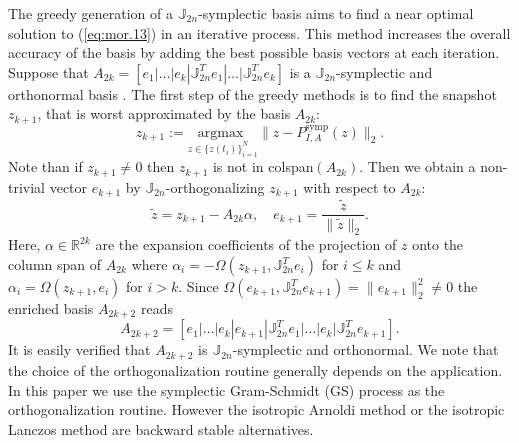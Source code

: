 The greedy generation of a $\mathbb J_{2n}$-symplectic basis aims to find a near optimal solution to (\ref{eq:mor.13}) in an iterative process. This method increases the overall accuracy of the basis by adding the best possible basis vectors at each iteration. Suppose that $A_{2k} = [e_1|\dots|e_k|\mathbb J_{2n}^T e_1|\dots|\mathbb J_{2n}^T e_k]$ is a $\mathbb J_{2n}$-symplectic and orthonormal basis \cite{doi:10.1137/17M1111991}. The first step of the greedy methods is to find the snapshot $z_{k+1}$, that is worst approximated by the basis $A_{2k}$:
\begin{equation} \label{eq:mor.14}
	z_{k+1} := \underset{z \in \{ z(t_i) \}_{i=1}^N}{\text{argmax } }\| z - P^\text{symp}_{I,A}(z) \|_2. 
\end{equation}
Note than if $z_{k+1}\neq 0$ then $z_{k+1}$ is not in colspan$(A_{2k})$. Then we obtain a non-trivial vector $e_{k+1}$ by $\mathbb J_{2n}$-orthogonalizing $z_{k+1}$ with respect to $A_{2k}$:
\begin{equation} \label{eq:mor.14.1}
	\tilde z = z_{k+1} - A_{2k}\alpha, \quad e_{k+1} = \frac{\tilde z}{\|\tilde z \|_2}.
\end{equation}
Here, $\alpha\in \mathbb R^{2k}$ are the expansion coefficients of the projection of $z$ onto the column span of $A_{2k}$ where $\alpha_i = -\Omega(z_{k+1},\mathbb J_{2n}^Te_i)$ for $i\leq k$ and $\alpha_i = \Omega(z_{k+1},e_i)$ for $i>k$. Since $\Omega(e_{k+1},\mathbb{J}_{2n}^T e_{k+1}) = \| e_{k+1} \|_2^2 \neq 0$ the enriched basis $A_{2k+2}$ reads
\begin{equation} \label{eq:mor.15}
	A_{2k+2} = [e_1|\dots|e_k|e_{k+1}|\mathbb J_{2n}^Te_1|\dots|e_k|\mathbb J_{2n}^Te_{k+1}].	
\end{equation}
It is easily verified that $A_{2k+2}$ is $\mathbb J_{2n}$-symplectic and orthonormal. We note that the choice of the orthogonalization routine generally depends on the application. In this paper we use the symplectic Gram-Schmidt (GS) process as the orthogonalization routine. However the isotropic Arnoldi method or the isotropic Lanczos method \cite{doi:10.1137/S1064827500366434} are backward stable alternatives.

